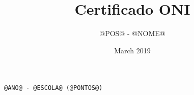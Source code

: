 \documentclass{article}
\title{Certificado ONI}
\author{@POS@ - @NOME@}
\date{March 2019}
\begin{document}
\maketitle
\begin{verbatim}
@ANO@ - @ESCOLA@ (@PONTOS@)
\end{verbatim}
\end{document}
